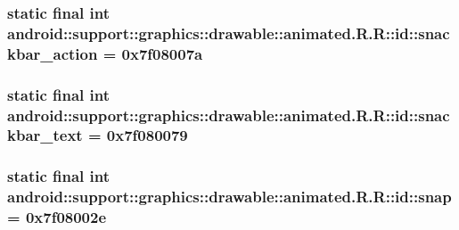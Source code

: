 \hypertarget{classandroid_1_1support_1_1graphics_1_1drawable_1_1animated_1_1_r_1_1id_bd962eb5eb8a0febf32ca835a645b242}{
\subsubsection[{snackbar\_\-action}]{\setlength{\rightskip}{0pt plus 5cm}static final int android::support::graphics::drawable::animated.R.R::id::snackbar\_\-action = 0x7f08007a}}
\label{classandroid_1_1support_1_1graphics_1_1drawable_1_1animated_1_1_r_1_1id_bd962eb5eb8a0febf32ca835a645b242}


\hypertarget{classandroid_1_1support_1_1graphics_1_1drawable_1_1animated_1_1_r_1_1id_c84371d25b4efb8e93085f8ce5584ce1}{
\subsubsection[{snackbar\_\-text}]{\setlength{\rightskip}{0pt plus 5cm}static final int android::support::graphics::drawable::animated.R.R::id::snackbar\_\-text = 0x7f080079}}
\label{classandroid_1_1support_1_1graphics_1_1drawable_1_1animated_1_1_r_1_1id_c84371d25b4efb8e93085f8ce5584ce1}


\hypertarget{classandroid_1_1support_1_1graphics_1_1drawable_1_1animated_1_1_r_1_1id_27d9db6be4ab032b12d97e808c4ad171}{
\subsubsection[{snap}]{\setlength{\rightskip}{0pt plus 5cm}static final int android::support::graphics::drawable::animated.R.R::id::snap = 0x7f08002e}}
\label{classandroid_1_1support_1_1graphics_1_1drawable_1_1animated_1_1_r_1_1id_27d9db6be4ab032b12d97e808c4ad171}


